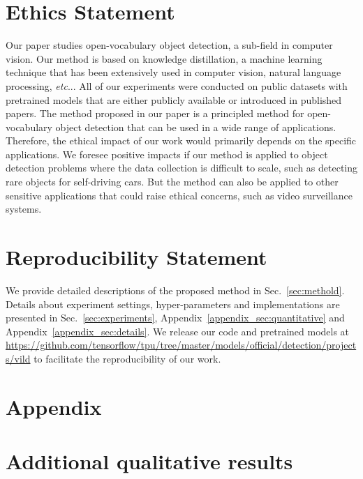 \documentclass{article} \usepackage{iclr2022_conference,times}
\makeatletter
\def\vs{{\bm{s}}}
\DeclareRobustCommand\onedot{\futurelet\@let@token\@onedot}
\def\@onedot{\ifx\@let@token.\else.\null\fi\xspace}
\def\etc{\emph{etc}\onedot} \def\vs{\emph{vs}\onedot}
\makeatother
\begin{document}
\clearpage

\section*{Ethics Statement}
Our paper studies open-vocabulary object detection, a sub-field in computer vision.
Our method is based on knowledge distillation, a machine learning technique that has been extensively used in computer vision, natural language processing, \etc.
All of our experiments were conducted on public datasets with pretrained models that are either publicly available or introduced in published papers.
The method proposed in our paper is a principled method for open-vocabulary object detection that can be used in a wide range of applications.
Therefore, the ethical impact of our work would primarily depends on the specific applications.
We foresee positive impacts if our method is applied to object detection problems where the data collection is difficult to scale, such as detecting rare objects for self-driving cars.
But the method can also be applied to other sensitive applications that could raise ethical concerns, such as video surveillance systems.

\section*{Reproducibility Statement}
We provide detailed descriptions of the proposed method in Sec.~\ref{sec:methold}.
Details about experiment settings, hyper-parameters and implementations are presented in Sec.~\ref{sec:experiments}, Appendix~\ref{appendix_sec:quantitative} and Appendix~\ref{appendix_sec:details}.
We release our code and pretrained models at \url{https://github.com/tensorflow/tpu/tree/master/models/official/detection/projects/vild} to facilitate the reproducibility of our work.






\clearpage

\appendix
\section*{Appendix}

\section{Additional qualitative results}\label{appendix_sec:qualitative}
\end{document}
